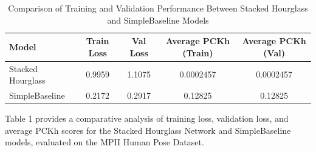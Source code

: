 \documentclass{article}
\begin{document}
\begin{table}[htpb]
    \centering
    \caption{Comparison of Training and Validation Performance Between Stacked Hourglass and SimpleBaseline Models}
    \label{tab:model_comparison}
    \begin{tabular}{|l|c|c|c|c|}
        \hline
        \textbf{Model} & \textbf{Train Loss} & \textbf{Val Loss} & \textbf{Average PCKh (Train)} & \textbf{Average PCKh (Val)} \\ \hline
        Stacked Hourglass & 0.9959 & 1.1075 & 0.0002457 & 0.0002457 \\ \hline
        SimpleBaseline    & 0.2172 & 0.2917 & 0.12825   & 0.12825   \\ \hline
    \end{tabular}
\end{table}
Table 1 provides a comparative analysis of training loss, validation loss, and average PCKh scores for the Stacked Hourglass Network and SimpleBaseline models, evaluated on the MPII Human Pose Dataset.
\end{document}
